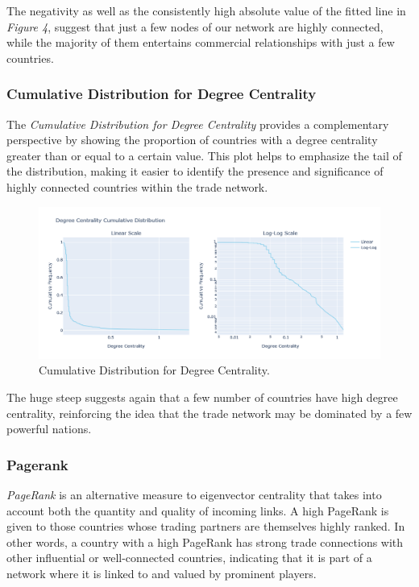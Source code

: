 \documentclass[12pt, a4paper]{article}
\begin{document}
The negativity as well as the consistently high absolute value of the fitted line in \textit{Figure 4}, suggest that just a few nodes of our network are highly connected, while the majority of them entertains commercial relationships with just a few countries.

\subsubsection{Cumulative Distribution for Degree Centrality}

The \textit{Cumulative Distribution for Degree Centrality} provides a complementary perspective by showing the proportion of countries with a degree centrality greater than or equal to a certain value. This plot helps to emphasize the tail of the distribution, making it easier to identify the presence and significance of highly connected countries within the trade network.

\begin{figure}[ht]
\centering
\includegraphics[width=.8\textwidth]{figures/question2/figure_5.png}
\captionsetup{font=scriptsize,labelfont=bf}
\caption{Cumulative Distribution for Degree Centrality.}
\label{fig:figure5}
\end{figure}

The huge steep suggests again that a few number of countries have high degree centrality, reinforcing the idea that the trade network may be dominated by a few powerful nations.

\subsubsection{Pagerank}
\textit{PageRank} is an alternative measure to eigenvector centrality that takes into account both the quantity and quality of incoming links. A high PageRank is given to those countries whose trading partners are themselves highly ranked. In other words, a country with a high PageRank has strong trade connections with other influential or well-connected countries, indicating that it is part of a network where it is linked to and valued by prominent players.
\end{document}
